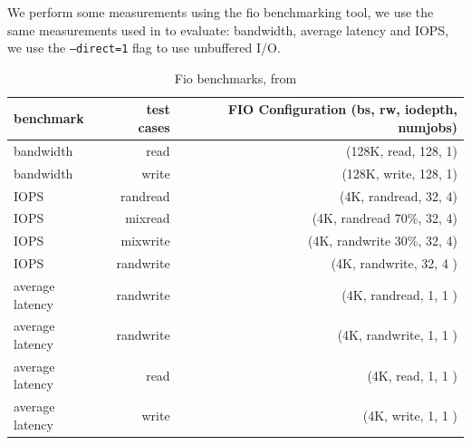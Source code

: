\documentclass[twocolumn]{article}
\begin{document}
    We perform some measurements using the fio \cite{fio} benchmarking tool, we use the same measurements used in \cite{spool} to evaluate: bandwidth, average latency and IOPS, we use the \texttt{--direct=1} flag to use unbuffered I/O.
    \begin{table}
        \centering
        \label{tab:fio-benchmarks}
        \begin{tabular}{l|r|r}
                        \hline

        \textbf{benchmark} & \textbf{test cases} & \textbf{FIO Configuration (bs, rw, iodepth, numjobs)} \\
        \hline
        bandwidth          &  read               & (128K, read, 128, 1)                                  \\
        bandwidth          & write               & (128K, write, 128, 1)                                 \\
        IOPS               &  randread           &(4K, randread, 32, 4)                                  \\
        IOPS               & mixread             & (4K, randread 70\%, 32, 4)                            \\
        IOPS               &  mixwrite           & (4K, randwrite 30\%, 32, 4)                           \\
        IOPS               &  randwrite          &  (4K, randwrite, 32, 4 )                              \\
        average latency    &  randwrite          & (4K, randread, 1, 1 )                                 \\
        average latency    &  randwrite          & (4K, randwrite, 1, 1 )                                \\
        average latency    &  read               &(4K, read, 1, 1 )                                      \\
        average latency    &  write	             & (4K, write, 1, 1 )                                    \\
        \end{tabular}
        \caption{Fio benchmarks, from \cite{spool}} 
    \end{table}
\end{document}
